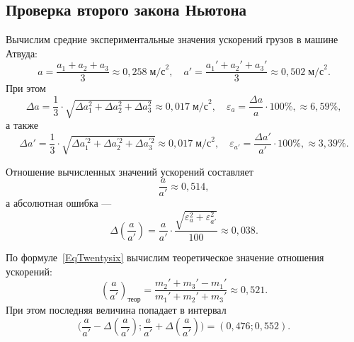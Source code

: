 \subsection{Проверка второго закона Ньютона}

Вычислим средние экспериментальные значения ускорений грузов в машине Атвуда:
\[
a=\frac{a_1+a_2+a_3}{3}\approx0{,}258\;\text{м/с}^2,\quad a'=\frac{a_1'+a_2'+a_3'}{3}\approx0{,}502\;\text{м/с}^2.
\]
При этом
\[
\Delta a=\frac{1}{3}\cdot\sqrt{\Delta a_1^2+\Delta a_2^2+\Delta a_3^2}\approx0{,}017\;\text{м/с}^2,\quad\varepsilon_{a}=\frac{\Delta a}{a}\cdot100\%,\approx6{,}59\%,
\]
а также
\[
\Delta a'=\frac{1}{3}\cdot\sqrt{\Delta a_1^{'2}+\Delta a_2^{'2}+\Delta a_3^{'2}}\approx0{,}017\;\text{м/с}^2,\quad\varepsilon_{a'}=\frac{\Delta a'}{a'}\cdot100\%,\approx3{,}39\%.
\]

Отношение вычисленных значений ускорений составляет
\[
\frac{a}{a'}\approx0{,}514,
\]
а абсолютная ошибка ---
\[
\Delta\left(\frac{a}{a'}\right)=\frac{a}{a'}\cdot\frac{\sqrt{\varepsilon_a^2+\varepsilon_{a'}^2}}{100}\approx0{,}038.
\]

По формуле~\eqref{EqTwentysix} вычислим теоретическое значение отношения ускорений:
\[
\left(\frac{a}{a'}\right)_\text{теор}=\frac{m_2'+m_3'-m_1'}{m_1'+m_2'+m_3'}\approx0{,}521.
\]
При этом последняя величина попадает в интервал
\[
\biggl(\frac{a}{a'}-\Delta\left(\frac{a}{a'}\right);\frac{a}{a'}+\Delta\left(\frac{a}{a'}\right)\biggr)=(0{,}476;0{,}552).
\]